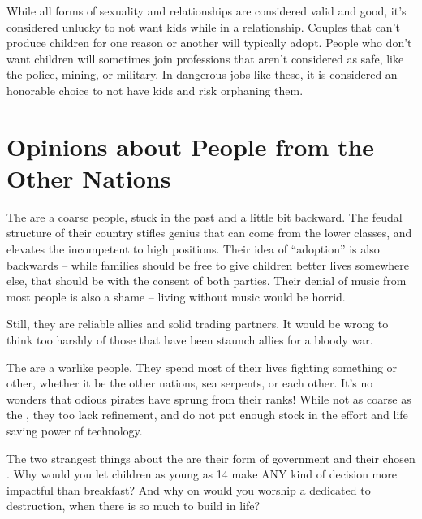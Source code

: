 \documentclass[blue]{GL2020}
\begin{document}
While all forms of sexuality and relationships are considered valid and good, it's considered unlucky to not want kids while in a relationship. Couples that can’t produce children for one reason or another will typically adopt. People who don't want children will sometimes join professions that aren't considered as safe, like the police, mining, or military. In dangerous jobs like these, it is considered an honorable choice to not have kids and risk orphaning them.

\section*{Opinions about People from the Other Nations}			
The \pFarmers{} are a coarse people, stuck in the past and a little bit backward. The feudal structure of their country stifles genius that can come from the lower classes, and elevates the incompetent to high positions. Their idea of ``adoption'' is also backwards -- while families should be free to give children better lives somewhere else, that should be with the consent of both parties. Their denial of music from most people is also a shame -- living without music would be horrid.

Still, they are reliable allies and solid trading partners. It would be wrong to think too harshly of those that have been staunch allies for a bloody war.


The \pShippies{} are a warlike people. They spend most of their lives fighting something or other, whether it be the other nations, sea serpents, or each other. It’s no wonders that odious pirates have sprung from their ranks! While not as coarse as the \pFarmers{}, they too lack refinement, and do not put enough stock in the effort and life saving power of technology. 

The two strangest things about the \pShippies{} are their form of government and their chosen \cEbb{\Deity}. Why would you let children as young as 14 make ANY kind of decision more impactful than breakfast? And why on \pEarth{} would you worship a \cEbb{\Deity} dedicated to destruction, when there is so much to build in life?

					
\end{document}
